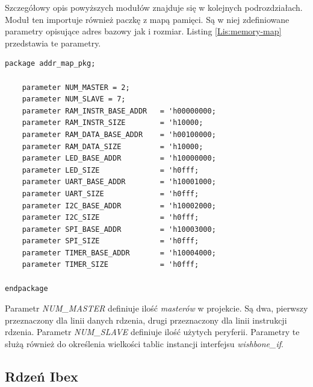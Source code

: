 \documentclass[11pt,a4paper]{article}
\begin{document}
Szczegółowy opis powyższych modułów znajduje się w kolejnych podrozdziałach. 
Moduł ten importuje również paczkę z mapą pamięci. Są w niej zdefiniowane parametry opisujące adres bazowy jak i rozmiar. Listing \ref{Lis:memory-map} przedstawia te parametry.

\begin{minipage}{\textwidth}
\begin{scriptsize}
\begin{lstlisting}[label=Lis:memory-map,caption=Mapa pamięci]
package addr_map_pkg;

	parameter NUM_MASTER = 2;
	parameter NUM_SLAVE = 7;
	parameter RAM_INSTR_BASE_ADDR   = 'h00000000;
	parameter RAM_INSTR_SIZE        = 'h10000;
	parameter RAM_DATA_BASE_ADDR    = 'h00100000;
	parameter RAM_DATA_SIZE         = 'h10000;
	parameter LED_BASE_ADDR         = 'h10000000;
	parameter LED_SIZE              = 'h0fff;
	parameter UART_BASE_ADDR        = 'h10001000;
	parameter UART_SIZE             = 'h0fff;
	parameter I2C_BASE_ADDR         = 'h10002000;
	parameter I2C_SIZE              = 'h0fff;
	parameter SPI_BASE_ADDR         = 'h10003000;
	parameter SPI_SIZE              = 'h0fff;
	parameter TIMER_BASE_ADDR       = 'h10004000;
	parameter TIMER_SIZE            = 'h0fff;

endpackage
\end{lstlisting}
\end{scriptsize}
\end{minipage}
Parametr \textit{NUM\_MASTER} definiuje ilość \textit{masterów} w projekcie. Są dwa, pierwszy przeznaczony dla linii danych rdzenia, drugi przeznaczony dla linii instrukcji rdzenia. Parametr \textit{NUM\_SLAVE} definiuje ilość użytych peryferii. Parametry te służą również do określenia wielkości tablic instancji interfejsu \textit{wishbone\_if}.
	\subsection{Rdzeń Ibex}
\end{document}
